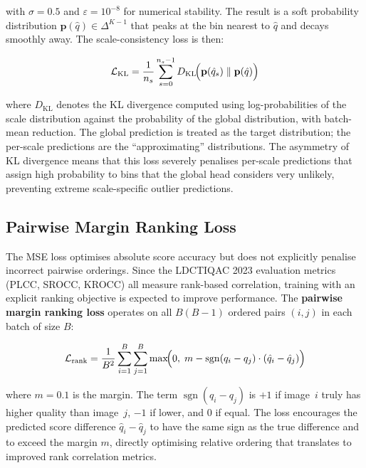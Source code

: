 with $\sigma = 0.5$ and $\varepsilon = 10^{-8}$ for numerical stability. The result is a
soft probability distribution $\mathbf{p}(\hat{q}) \in \Delta^{K-1}$ that peaks at the
bin nearest to $\hat{q}$ and decays smoothly away. The scale-consistency loss is then:

\begin{equation}
    \mathcal{L}_{\text{KL}} = \frac{1}{n_s} \sum_{s=0}^{n_s - 1}
    D_{\text{KL}}\!\Bigl(\mathbf{p}(\hat{q}_s) \;\|\; \mathbf{p}(\hat{q})\Bigr)
    \label{eq:kl_loss}
\end{equation}

where $D_{\text{KL}}$ denotes the KL divergence computed using log-probabilities of the
scale distribution against the probability of the global distribution, with batch-mean
reduction. The global prediction is treated as the target distribution; the per-scale
predictions are the ``approximating'' distributions. The asymmetry of KL divergence
means that this loss severely penalises per-scale predictions that assign high probability
to bins that the global head considers very unlikely, preventing extreme scale-specific
outlier predictions.

\subsection{Pairwise Margin Ranking Loss}

The MSE loss optimises absolute score accuracy but does not explicitly penalise incorrect
pairwise orderings. Since the LDCTIQAC 2023 evaluation metrics (PLCC, SROCC, KROCC) all
measure rank-based correlation, training with an explicit ranking objective is expected to
improve performance. The \textbf{pairwise margin ranking loss} operates on all $B(B-1)$
ordered pairs $(i, j)$ in each batch of size $B$:

\begin{equation}
    \mathcal{L}_{\text{rank}} = \frac{1}{B^2} \sum_{i=1}^{B} \sum_{j=1}^{B}
    \max\!\Bigl(0,\; m - \operatorname{sgn}(q_i - q_j) \cdot (\hat{q}_i - \hat{q}_j)\Bigr)
    \label{eq:rank_loss}
\end{equation}

where $m = 0.1$ is the margin. The term $\operatorname{sgn}(q_i - q_j)$ is $+1$ if
image~$i$ truly has higher quality than image~$j$, $-1$ if lower, and $0$ if equal.
The loss encourages the predicted score difference $\hat{q}_i - \hat{q}_j$ to have the
same sign as the true difference and to exceed the margin $m$, directly optimising
relative ordering that translates to improved rank correlation metrics.

